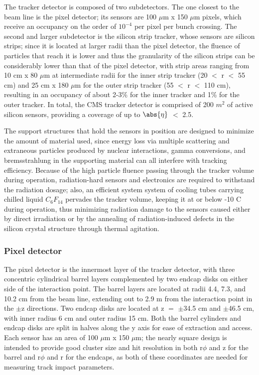The tracker detector is composed of two subdetectors. The one closest to the beam line is the pixel detector; its sensors are 100 $\mu$m x 150 $\mu$m pixels, which receive an occupancy on the order of $10^{-4}$ per pixel per bunch crossing. The second and larger subdetector is the silicon strip tracker, whose sensors are silicon strips; since it is located at larger radii than the pixel detector, the fluence of particles that reach it is lower and thus the granularity of the silicon strips can be considerably lower than that of the pixel detector, with strip areas ranging from 10 cm x 80 $\mu$m at intermediate radii for the inner strip tracker (20 $<$ r $<$ 55 cm) and 25 cm x 180 $\mu$m for the outer strip tracker (55 $<$ r $<$ 110 cm), resulting in an occupancy of about 2-3\% for the inner tracker and 1\% for the outer tracker. In total, the CMS tracker detector is comprised of 200 $m^{2}$ of active silicon sensors, providing a coverage of up to $\abs{\eta}$ $<$ 2.5.

The support structures that hold the sensors in position are designed to minimize the amount of material used, since energy loss via multiple scattering and extraneous particles produced by nuclear interactions, gamma conversions, and bremsstrahlung in the supporting material can all interfere with tracking efficiency. Because of the high particle fluence passing through the tracker volume during operation, radiation-hard sensors and electronics are required to withstand the radiation dosage; also, an efficient system system of cooling tubes carrying chilled liquid $C_{6}F_{14}$ pervades the tracker volume, keeping it at or below -10 C during operation, thus minimizing radiation damage to the sensors caused either by direct irradiation or by the annealing of radiation-induced defects in the silicon crystal structure through thermal agitation.

\subsubsection{Pixel detector\label{sec:cms-pixel}}

The pixel detector is the innermost layer of the tracker detector, with three concentric cylindrical barrel layers complemented by two endcap disks on either side of the interaction point. The barrel layers are located at radii 4.4, 7.3, and 10.2 cm from the beam line, extending out to 2.9 m from the interaction point in the $\pm$z directions. Two endcap disks are located at z $=$ $\pm$34.5 cm and $\pm$46.5 cm, with inner radius 6 cm and outer radius 15 cm. Both the barrel cylinders and endcap disks are split in halves along the y axis for ease of extraction and access. Each sensor has an area of 100 $\mu$m x 150 $\mu$m; the nearly square design is intended to provide good cluster size and hit resolution in both r$\phi$ and z for the barrel and r$\phi$ and r for the endcaps, as both of these coordinates are needed for measuring track impact parameters.

